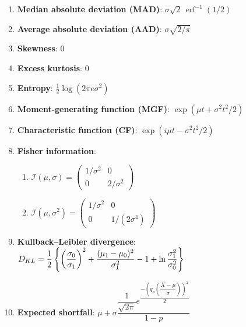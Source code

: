 \begin{enumerate}
    \item 
    \textbf{Median absolute deviation (MAD)}:
    $ {\displaystyle \sigma {\sqrt {2}}\,\operatorname {erf} ^{-1}(1/2)} $
    \hfill\cite{wiki/Normal_distribution}

    \item 
    \textbf{Average absolute deviation (AAD)}:
    $ {\textstyle \sigma {\sqrt {2/\pi }}} $
    \hfill\cite{wiki/Normal_distribution}

    \item 
    \textbf{Skewness}: $0$
    \hfill\cite{wiki/Normal_distribution}

    \item 
    \textbf{Excess kurtosis}: $0$
    \hfill\cite{wiki/Normal_distribution}

    \item 
    \textbf{Entropy}: $ {\textstyle {\tfrac {1}{2}}\log(2\pi e\sigma ^{2})} $
    \hfill\cite{wiki/Normal_distribution}

    \item 
    \textbf{Moment-generating function (MGF)}: $ {\displaystyle \exp(\mu t+\sigma ^{2}t^{2}/2)} $ 
    \hfill\cite{wiki/Normal_distribution}

    \item 
    \textbf{Characteristic function (CF)}: $ {\displaystyle \exp(i\mu t-\sigma ^{2}t^{2}/2)} $ 
    \hfill\cite{wiki/Normal_distribution}

    \item 
    \textbf{Fisher information}:
    \begin{enumerate}
        \item ${\displaystyle {\mathcal {I}}(\mu ,\sigma )={\begin{pmatrix}1/\sigma ^{2}&0\\0&2/\sigma ^{2}\end{pmatrix}}}$

        \item ${\displaystyle {\mathcal {I}}(\mu ,\sigma ^{2})={\begin{pmatrix}1/\sigma ^{2}&0\\0&1/(2\sigma ^{4})\end{pmatrix}}}$
    \end{enumerate}
    \hfill\cite{wiki/Normal_distribution}
    
    \item 
    \textbf{Kullback–Leibler divergence}:
    ${\displaystyle D_{KL} = {1 \over 2}\left\{\left({\dfrac {\sigma _{0}}{\sigma _{1}}}\right)^{2}+{\dfrac {(\mu _{1}-\mu _{0})^{2}}{\sigma _{1}^{2}}}-1+\ln {\sigma _{1}^{2} \over \sigma _{0}^{2}}\right\}}$
    \hfill\cite{wiki/Normal_distribution}

    \item 
    \textbf{Expected shortfall}:
    ${\displaystyle \mu +\sigma {\dfrac {{\dfrac {1}{\sqrt {2\pi }}}e^{\dfrac {-\left(q_{p}\left({\dfrac {X-\mu }{\sigma }}\right)\right)^{2}}{2}}}{1-p}}}$
    \hfill\cite{wiki/Normal_distribution}

\end{enumerate}

